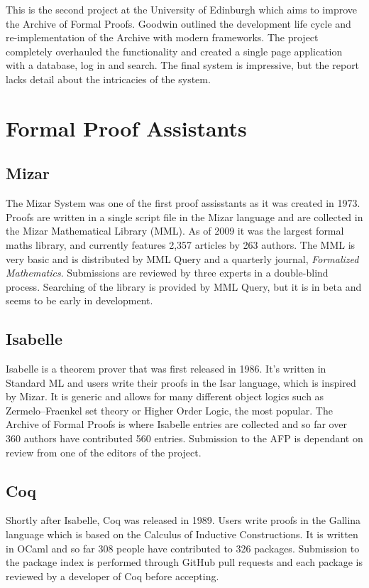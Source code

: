 \documentclass[frontabs,bsc,singlespacing,parskip,deptreport]{infthesis}
\begin{document}
This is the second project at the University of Edinburgh which aims to improve the Archive of Formal Proofs. Goodwin\cite{Goodwin2020} outlined the development life cycle and re-implementation of the Archive with modern frameworks. The project completely overhauled the functionality and created a single page application with a database, log in and search. The final system is impressive, but the report lacks detail about the intricacies of the system. 

\section{Formal Proof Assistants}

\subsection{Mizar}

The Mizar System was one of the first proof assisstants as it was created in 1973. Proofs are written in a single script file in the Mizar language and are collected in the Mizar Mathematical Library (MML). As of 2009 it was the largest formal maths library, and currently features 2,357 articles by 263 authors. The MML is very basic and is distributed by MML Query and a quarterly journal, \textit{Formalized Mathematics}. Submissions are reviewed by three experts in a double-blind process. Searching of the library is provided by MML Query, but it is in beta and seems to be early in development.

\subsection{Isabelle}

Isabelle is a theorem prover that was first released in 1986. It's written in Standard ML and users write their proofs in the Isar language, which is inspired by Mizar. It is generic and allows for many different object logics such as Zermelo–Fraenkel set theory or Higher Order Logic, the most popular. The Archive of Formal Proofs is where Isabelle entries are collected and so far over 360 authors have contributed 560 entries. Submission to the AFP is dependant on review from one of the editors of the project.

\subsection{Coq}

Shortly after Isabelle, Coq was released in 1989. Users write proofs in the Gallina language which is based on the Calculus of Inductive Constructions. It is written in OCaml and so far 308 people have contributed to 326 packages. Submission to the package index is performed through GitHub pull requests and each package is reviewed by a developer of Coq before accepting.
\end{document}
